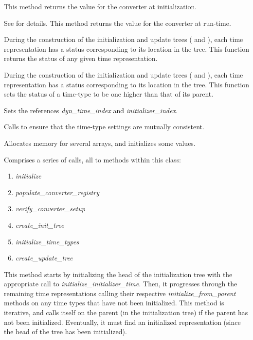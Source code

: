 {\begin{enumerate}
{\begin{enumerate}
This method returns the value for the converter at initialization.

\label{ref:getconvdirupd}
See  for details.  This
method returns the
value for the converter at run-time.

During the construction of the initialization and update trees
( and
), each time
representation has a status
corresponding to its location in the tree.  This function returns the
status of any given time representation.

During the construction of the initialization and update trees
( and
), each time
representation has a status
corresponding to its location in the tree.  This function sets the
status of a time-type to be one higher than that of its parent.

Sets the references \textit{dyn\_time\_index }and
\textit{initializer\_index.}

Calls  to ensure that the
time-type
settings are mutually consistent.

Allocates memory for several arrays, and initializes some values.

\label{ref:initializemanager}Comprises a series of calls, all to methods
within this class:


\begin{enumerate}
\item \textit{initialize}
\item \textit{populate\_converter\_registry}
\item \textit{verify\_converter\_setup}
\item \textit{create\_init\_tree}
\item \textit{initialize\_time\_types}
\item \textit{create\_update\_tree}
\end{enumerate}


This method starts by initializing the head of the initialization tree
with the appropriate call to \textit{initialize\_initializer\_time.
}Then, it progresses through the remaining time representations calling
their respective \textit{initialize\_from\_parent} methods on any time
types that have not been initialized.  This method is iterative, and
calls itself on the parent (in the initialization tree) if the parent
has not been initialized.  Eventually, it must find an initialized
representation (since the head of the tree has been initialized).


\end{enumerate}}
\end{enumerate}}
